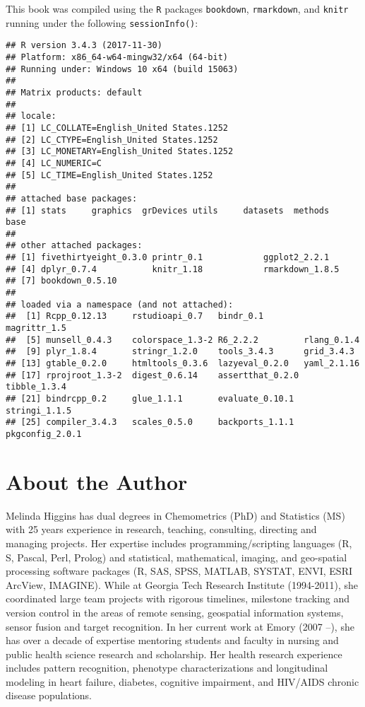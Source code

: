 \documentclass[]{book}
\theoremstyle{definition}
\theoremstyle{definition}
\theoremstyle{definition}
\theoremstyle{remark}
\begin{document}
This book was compiled using the \texttt{R} packages \texttt{bookdown},
\texttt{rmarkdown}, and \texttt{knitr} running under the following
\texttt{sessionInfo()}:

\begin{verbatim}
## R version 3.4.3 (2017-11-30)
## Platform: x86_64-w64-mingw32/x64 (64-bit)
## Running under: Windows 10 x64 (build 15063)
## 
## Matrix products: default
## 
## locale:
## [1] LC_COLLATE=English_United States.1252 
## [2] LC_CTYPE=English_United States.1252   
## [3] LC_MONETARY=English_United States.1252
## [4] LC_NUMERIC=C                          
## [5] LC_TIME=English_United States.1252    
## 
## attached base packages:
## [1] stats     graphics  grDevices utils     datasets  methods   base     
## 
## other attached packages:
## [1] fivethirtyeight_0.3.0 printr_0.1            ggplot2_2.2.1        
## [4] dplyr_0.7.4           knitr_1.18            rmarkdown_1.8.5      
## [7] bookdown_0.5.10      
## 
## loaded via a namespace (and not attached):
##  [1] Rcpp_0.12.13     rstudioapi_0.7   bindr_0.1        magrittr_1.5    
##  [5] munsell_0.4.3    colorspace_1.3-2 R6_2.2.2         rlang_0.1.4     
##  [9] plyr_1.8.4       stringr_1.2.0    tools_3.4.3      grid_3.4.3      
## [13] gtable_0.2.0     htmltools_0.3.6  lazyeval_0.2.0   yaml_2.1.16     
## [17] rprojroot_1.3-2  digest_0.6.14    assertthat_0.2.0 tibble_1.3.4    
## [21] bindrcpp_0.2     glue_1.1.1       evaluate_0.10.1  stringi_1.1.5   
## [25] compiler_3.4.3   scales_0.5.0     backports_1.1.1  pkgconfig_2.0.1
\end{verbatim}

\chapter*{About the Author}\label{about-the-author}

Melinda Higgins has dual degrees in Chemometrics (PhD) and Statistics
(MS) with 25 years experience in research, teaching, consulting,
directing and managing projects. Her expertise includes
programming/scripting languages (R, S, Pascal, Perl, Prolog) and
statistical, mathematical, imaging, and geo-spatial processing software
packages (R, SAS, SPSS, MATLAB, SYSTAT, ENVI, ESRI ArcView, IMAGINE).
While at Georgia Tech Research Institute (1994-2011), she coordinated
large team projects with rigorous timelines, milestone tracking and
version control in the areas of remote sensing, geospatial information
systems, sensor fusion and target recognition. In her current work at
Emory (2007 --), she has over a decade of expertise mentoring students
and faculty in nursing and public health science research and
scholarship. Her health research experience includes pattern
recognition, phenotype characterizations and longitudinal modeling in
heart failure, diabetes, cognitive impairment, and HIV/AIDS chronic
disease populations.
\end{document}
